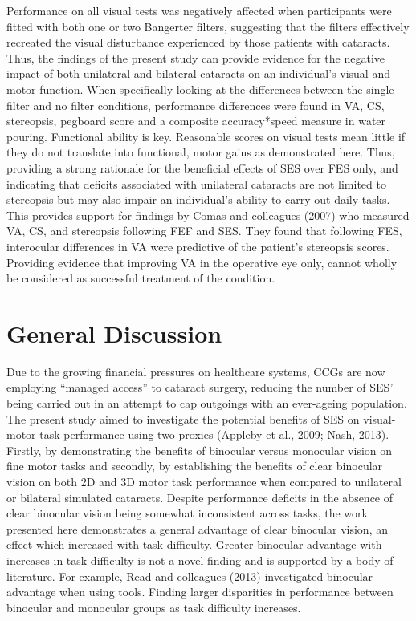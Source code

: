 \documentclass[
  english,
  man,floatsintext]{apa6}
\begin{document}
Performance on all visual tests was negatively affected when participants were fitted with both one or two Bangerter filters, suggesting that the filters effectively recreated the visual disturbance experienced by those patients with cataracts.
Thus, the findings of the present study can provide evidence for the negative impact of both unilateral and bilateral cataracts on an individual's visual and motor function.
When specifically looking at the differences between the single filter and no filter conditions, performance differences were found in VA, CS, stereopsis, pegboard score and a composite accuracy*speed measure in water pouring.
Functional ability is key. Reasonable scores on visual tests mean little if they do not translate into functional, motor gains as demonstrated here.
Thus, providing a strong rationale for the beneficial effects of SES over FES only, and indicating that deficits associated with unilateral cataracts are not limited to stereopsis but may also impair an individual's ability to carry out daily tasks.
This provides support for findings by Comas and colleagues (2007) who measured VA, CS, and stereopsis following FEF and SES.
They found that following FES, interocular differences in VA were predictive of the patient's stereopsis scores.
Providing evidence that improving VA in the operative eye only, cannot wholly be considered as successful treatment of the condition.

\hypertarget{general-discussion}{%
\section{General Discussion}\label{general-discussion}}

Due to the growing financial pressures on healthcare systems, CCGs are now employing \enquote{managed access} to cataract surgery, reducing the number of SES' being carried out in an attempt to cap outgoings with an ever-ageing population.
The present study aimed to investigate the potential benefits of SES on visual-motor task performance using two proxies (Appleby et al., 2009; Nash, 2013).
Firstly, by demonstrating the benefits of binocular versus monocular vision on fine motor tasks and secondly, by establishing the benefits of clear binocular vision on both 2D and 3D motor task performance when compared to unilateral or bilateral simulated cataracts.
Despite performance deficits in the absence of clear binocular vision being somewhat inconsistent across tasks, the work presented here demonstrates a general advantage of clear binocular vision, an effect which increased with task difficulty.
Greater binocular advantage with increases in task difficulty is not a novel finding and is supported by a body of literature.
For example, Read and colleagues (2013) investigated binocular advantage when using tools. Finding larger disparities in performance between binocular and monocular groups as task difficulty increases.
\end{document}
